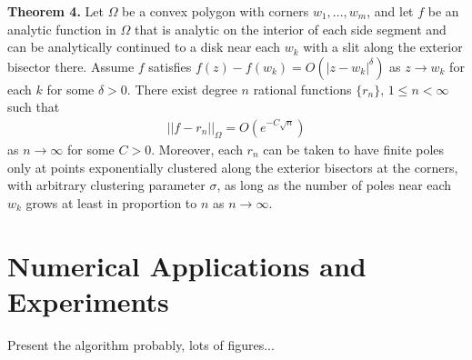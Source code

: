 \documentclass[12]{article}
\begin{document}
	\textbf{Theorem 4.} Let $\Omega$ be a convex polygon with corners $w_1 , \ldots , w_m$, and let $f$ be an analytic function in $\Omega$ that is analytic on the interior of each side segment and can be analytically continued to a disk near each $w_k$ with a slit along the exterior bisector there. Assume $f$ satisfies $f(z)-f(w_k)=O(|z-w_k|^\delta)$ as $z \to w_k$ for each $k$ for some $\delta >0$. There exist degree $n$ rational functions $\{r_n\},\, 1 \leq n < \infty$ such that
	\begin{align*}
||f-r_n||_\Omega=O(e^{-C\sqrt{n}})
	\end{align*}
as $n\to \infty$ for some $C>0$. Moreover, each $r_n$ can be taken to have finite poles only at points exponentially clustered along the exterior bisectors at the corners, with arbitrary clustering parameter $\sigma$, as long as the number of poles near each $w_k$ grows at least in proportion to $n$ as $n\to \infty$.

	
	\section{Numerical Applications and Experiments}
	
	Present the algorithm probably, lots of figures...
\end{document}
